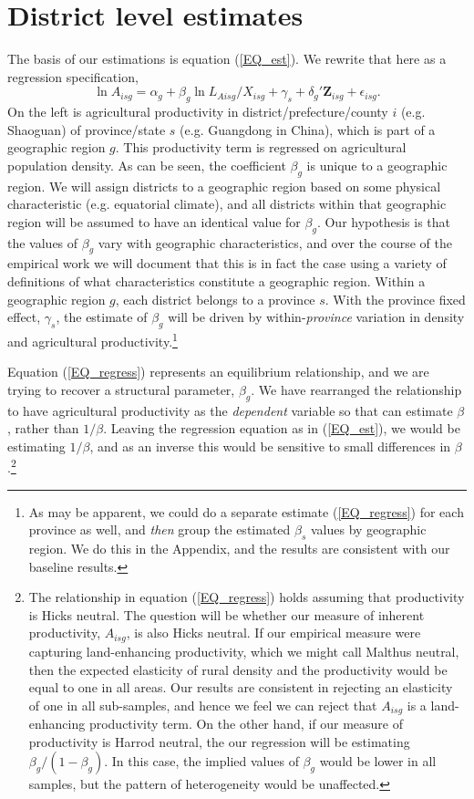 \documentclass[11pt]{article}
\begin{document}
\section{District level estimates}
The basis of our estimations is equation (\ref{EQ_est}). We rewrite that here as a regression specification,
\begin{equation}
	\ln A_{isg} = \alpha_g + \beta_g \ln L_{Aisg}/X_{isg} + \gamma_{s} + \delta_g' \mathbf{Z}_{isg} + \epsilon_{isg}. \label{EQ_regress}
\end{equation}
On the left is agricultural productivity in district/prefecture/county $i$ (e.g. Shaoguan) of province/state $s$ (e.g. Guangdong in China), which is part of a geographic region $g$. This productivity term is regressed on agricultural population density. As can be seen, the coefficient $\beta_g$ is unique to a geographic region. We will assign districts to a geographic region based on some physical characteristic (e.g. equatorial climate), and all districts within that geographic region will be assumed to have an identical value for $\beta_g$. Our hypothesis is that the values of $\beta_g$ vary with geographic characteristics, and over the course of the empirical work we will document that this is in fact the case using a variety of definitions of what characteristics constitute a geographic region. Within a geographic region $g$, each district belongs to a province $s$. With the province fixed effect, $\gamma_s$, the estimate of $\beta_g$ will be driven by within-\textit{province} variation in density and agricultural productivity.\footnote{As may be apparent, we could do a separate estimate (\ref{EQ_regress}) for each province as well, and \textit{then} group the estimated $\beta_s$ values by geographic region. We do this in the Appendix, and the results are consistent with our baseline results.} 

Equation (\ref{EQ_regress}) represents an equilibrium relationship, and we are trying to recover a structural parameter, $\beta_g$. We have rearranged the relationship to have agricultural productivity as the \textit{dependent} variable so that can estimate $\beta$, rather than $1/\beta$. Leaving the regression equation as in (\ref{EQ_est}), we would be estimating $1/\beta$, and as an inverse this would be sensitive to small differences in $\beta$.\footnote{The relationship in equation (\ref{EQ_regress}) holds assuming that productivity is Hicks neutral. The question will be whether our measure of inherent productivity, $A_{isg}$, is also Hicks neutral. If our empirical measure were capturing land-enhancing productivity, which we might call Malthus neutral, then the expected elasticity of rural density and the productivity would be equal to one in all areas. Our results are consistent in rejecting an elasticity of one in all sub-samples, and hence we feel we can reject that $A_{isg}$ is a land-enhancing productivity term. On the other hand, if our measure of productivity is Harrod neutral, the our regression will be estimating $\beta_g/(1-\beta_g)$. In this case, the implied values of $\beta_g$ would be lower in all samples, but the pattern of heterogeneity would be unaffected.}
\end{document}
